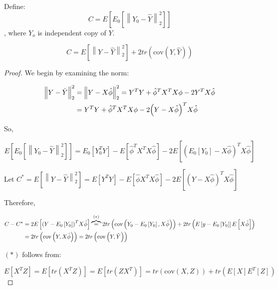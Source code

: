 \documentclass[]{book}
\theoremstyle{definition}
\theoremstyle{definition}
\theoremstyle{definition}
\theoremstyle{remark}
\let\BeginKnitrBlock\begin \let\EndKnitrBlock\end
\begin{document}
{Define:
\[C = E\left[ {{E_0}\left[ {\left\| {{Y_0} - \hat Y} \right\|_2^2} \right]} \right]\],
where \(Y_o\) is independent copy of \(Y\).

\BeginKnitrBlock{theorem}
\protect\hypertarget{thm:unnamed-chunk-16}{}{\label{thm:unnamed-chunk-16}
}\[C = E\left[ {\left\| {Y - \hat Y} \right\|_2^2} \right] + 2tr\left( {\text{cov}\left( {Y,\hat Y} \right)} \right)\]
\EndKnitrBlock{theorem}

\BeginKnitrBlock{proof}
{}We begin by examining the norm:

\begin{align*}
  \left\| {Y - \hat Y} \right\|_2^2 &= \left\| {Y - X\hat \phi } \right\|_2^2 = {Y^T}Y + {{\hat \phi }^T}{X^T}X\phi  - 2{Y^T}X\hat \phi  \hfill \\
   &= {Y^T}Y + {{\hat \phi }^T}{X^T}X\phi  - 2{\left( {Y - X\hat \phi } \right)^T}X\hat \phi  \hfill \\ 
\end{align*}

So,

\[E\left[ {{E_0}\left[ {\left\| {Y_0 - \hat Y} \right\|_2^2} \right]} \right] = {E_0}\left[ {Y_0^TY} \right] - E\left[ {{{\hat \phi }^T}{X^T}X\hat \phi } \right] - 2E\left[ {{{\left( {{E_0}\left[ {{Y_0}} \right] - X\hat \phi } \right)}^T}X\hat \phi } \right]\]

Let
\({C^*} = E\left[ {\left\| {Y - \hat Y} \right\|_2^2} \right] = E\left[ {{Y^T}Y} \right] - E\left[ {\hat \phi {X^T}X\hat \phi } \right] - 2E\left[ {{{\left( {Y - X\hat \phi } \right)}^T}X\hat \phi } \right]\)

Therefore,

\begin{align*}
  C - {C^*} &= 2E\left[ {{{\left( {Y - {E_0}\left[ {{Y_0}} \right]} \right)}^T}X\hat \phi } \right]\overbrace  = ^{\left( * \right)}2tr\left( {\text{cov}\left( {{Y_0} - {E_0}\left[ {{Y_0}} \right],X\hat \phi } \right)} \right) + 2tr\left( {E\left[ {y - {E_0}\left[ {{Y_0}} \right]} \right]E\left[ {X\hat \phi } \right]} \right) \hfill \\
   &= 2tr\left( {\text{cov}\left( {Y,X\hat \phi } \right)} \right) = 2tr\left( {\text{cov}\left( {Y,\hat Y} \right)} \right) \hfill \\ 
\end{align*}

\(\left({*}\right)\) follows from:

\[E\left[ {{X^T}Z} \right] = E\left[ {tr\left( {{X^T}Z} \right)} \right] = E\left[ {tr\left( {Z{X^T}} \right)} \right] = tr\left( {\text{cov}\left( {X,Z} \right)} \right) + tr\left( {E\left[ X \right]{E^T}\left[ Z \right]} \right)\]
\EndKnitrBlock{proof}

}
\end{document}
